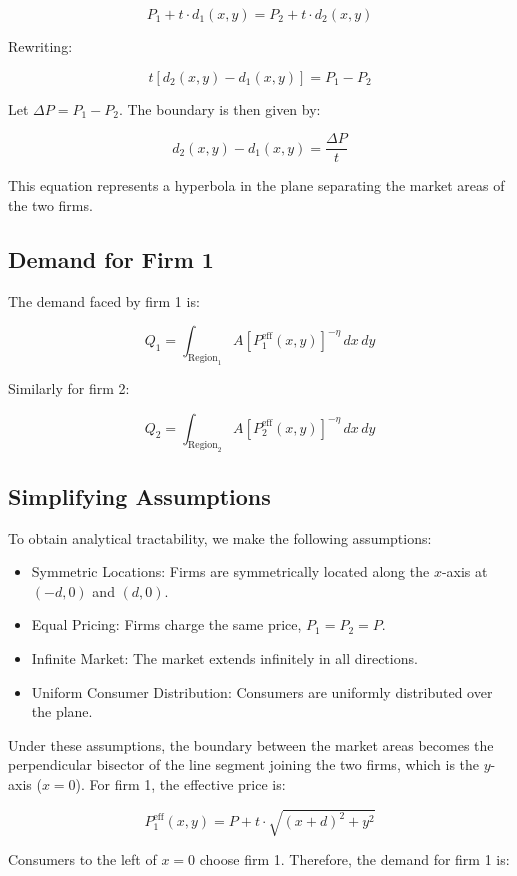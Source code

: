 \[
P_1 + t \cdot d_1(x, y) = P_2 + t \cdot d_2(x, y)
\]

Rewriting:

\[
t \left[ d_2(x, y) - d_1(x, y) \right] = P_1 - P_2
\]

Let \( \Delta P = P_1 - P_2 \). The boundary is then given by:

\[
d_2(x, y) - d_1(x, y) = \frac{\Delta P}{t}
\]

This equation represents a hyperbola in the plane separating the market areas of the two firms.

\subsection{Demand for Firm 1}

The demand faced by firm 1 is:

\[
Q_1 = \int_{\text{Region}_1} A \left[ P_1^{\text{eff}}(x, y) \right]^{-\eta} \, dx \, dy
\]

Similarly for firm 2:

\[
Q_2 = \int_{\text{Region}_2} A \left[ P_2^{\text{eff}}(x, y) \right]^{-\eta} \, dx \, dy
\]

\subsection{Simplifying Assumptions}

To obtain analytical tractability, we make the following assumptions:
\begin{itemize}
    \item Symmetric Locations: Firms are symmetrically located along the \( x \)-axis at \( (-d, 0) \) and \( (d, 0) \).
    \item Equal Pricing: Firms charge the same price, \( P_1 = P_2 = P \).
    \item Infinite Market: The market extends infinitely in all directions.
    \item Uniform Consumer Distribution: Consumers are uniformly distributed over the plane.
\end{itemize}

Under these assumptions, the boundary between the market areas becomes the perpendicular bisector of the line segment joining the two firms, which is the \( y \)-axis (\( x = 0 \)).
For firm 1, the effective price is:

\[
P_1^{\text{eff}}(x, y) = P + t \cdot \sqrt{(x + d)^2 + y^2}
\]

Consumers to the left of \( x = 0 \) choose firm 1. Therefore, the demand for firm 1 is:

